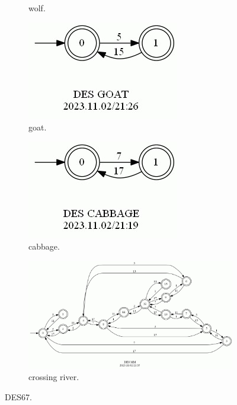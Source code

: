 \documentclass{article}
\begin{document}
\begin{figure}[h!]
\begin{subfigure}[b]{0.2\linewidth}
    \caption{wolf.}
  \end{subfigure}
  \begin{subfigure}[b]{0.2\linewidth}
    \includegraphics[width=\linewidth]{assets/GOAT.jpg}
    \caption{goat.}
  \end{subfigure}
  \begin{subfigure}[b]{0.2\linewidth}
    \includegraphics[width=\linewidth]{assets/CABBAGE.jpg}
    \caption{cabbage.}
  \end{subfigure}
  \begin{subfigure}[b]{\linewidth}
    \includegraphics[width=\linewidth]{assets/DES67.jpg}
    \caption{crossing river.}
  \end{subfigure}
  \caption{DES67.}
  \label{fig:des67}
\end{figure}
\end{document}
